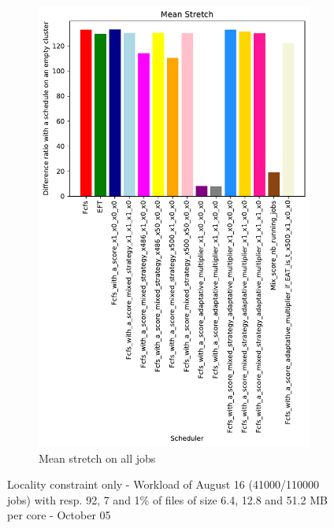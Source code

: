 \documentclass[a4paper]{article}
\begin{document}
\begin{figure}[H]
\begin{subfigure}[b]{0.4\linewidth}\centering\includegraphics[width=0.9\linewidth]{MBSS/plot/Results_FCFS_Score_Adaptative_Multiplier_2022-08-16->2022-08-16_V9271_Mean_Stretch_450_128_32_256_4_1024.pdf}\caption{Mean stretch on all jobs}\end{subfigure}
\caption{Locality constraint only - Workload of August 16 (41000/110000 jobs) with resp. 92, 7 and 1\% of files of size 6.4, 12.8 and 51.2 MB per core - October 05}\end{figure}
\end{document}
